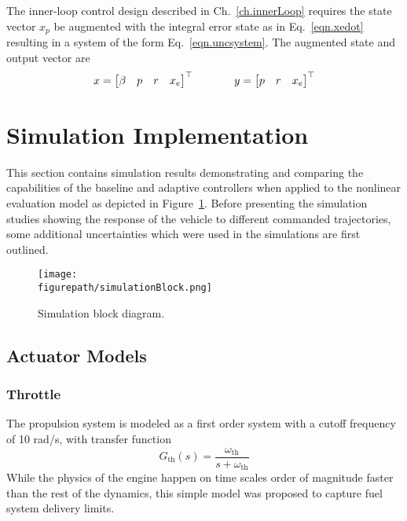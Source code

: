 The inner-loop control design described in Ch.~\ref{ch.innerLoop} requires the state vector $x_{p}$ be augmented with the integral error state as in Eq.\ \eqref{eqn.xedot} resulting in a system of the form Eq.\ \eqref{eqn.uncsystem}.
The augmented state and output vector are
\begin{equation*}
  x=
  \begin{bmatrix}
    \beta & p & r & x_{e}
  \end{bmatrix}^{\top}
  \hspace{0.5in}
  y=
  \begin{bmatrix}
    p & r & x_{e}
  \end{bmatrix}^{\top}
\end{equation*}

\section{Simulation Implementation}

This section contains simulation results demonstrating and comparing the capabilities of the baseline and adaptive controllers when applied to the nonlinear evaluation model as depicted in Figure~\ref{fig.simblockdiagram}.
Before presenting the simulation studies showing the response of the vehicle to different commanded trajectories, some additional uncertainties which were used in the simulations are first outlined.

\begin{figure}[H]
  \begin{center}
    \texttt{[image: \\figurepath/simulationBlock.png]}
    \vspace{-0.1in}
    \caption{Simulation block diagram.\label{fig.simblockdiagram}}
  \end{center}
\end{figure}

\subsection{Actuator Models}

\subsubsection{Throttle} The propulsion system is modeled as a first order system with a cutoff frequency of 10 rad/s, with transfer function
\begin{equation*}
  G_{\text{th}}(s)=\frac{\omega_{\text{th}}}{s+{\omega_{\text{th}}}}
\end{equation*}
While the physics of the engine happen on time scales order of magnitude faster than the rest of the dynamics, this simple model was proposed to capture fuel system delivery limits.

